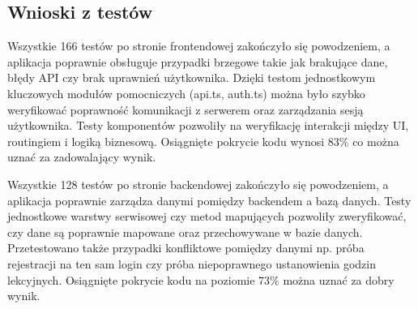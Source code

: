 \documentclass[12pt,a4paper]{article}
\begin{document}
\subsection{Wnioski z testów}
Wszystkie 166 testów po stronie frontendowej zakończyło się powodzeniem, a aplikacja poprawnie obsługuje przypadki brzegowe takie jak brakujące dane, błędy API czy brak uprawnień użytkownika. Dzięki testom jednostkowym kluczowych modułów pomocniczych (api.ts, auth.ts) można było szybko weryfikować poprawność komunikacji z serwerem oraz zarządzania sesją użytkownika. Testy komponentów pozwoliły na weryfikację interakcji między UI, routingiem i logiką biznesową. Osiągnięte pokrycie kodu wynosi 83\% co można uznać za zadowalający wynik.

Wszystkie 128 testów po stronie backendowej zakończyło się powodzeniem, a aplikacja poprawnie zarządza danymi pomiędzy backendem a bazą danych. Testy jednostkowe warstwy serwisowej czy metod mapujących pozwoliły zweryfikować, czy dane są poprawnie mapowane oraz przechowywane w bazie danych. Przetestowano także przypadki konfliktowe pomiędzy danymi np. próba rejestracji na ten sam login czy próba niepoprawnego ustanowienia godzin lekcyjnych. Osiągnięte pokrycie kodu na poziomie 73\% można uznać za dobry wynik.
\end{document}
